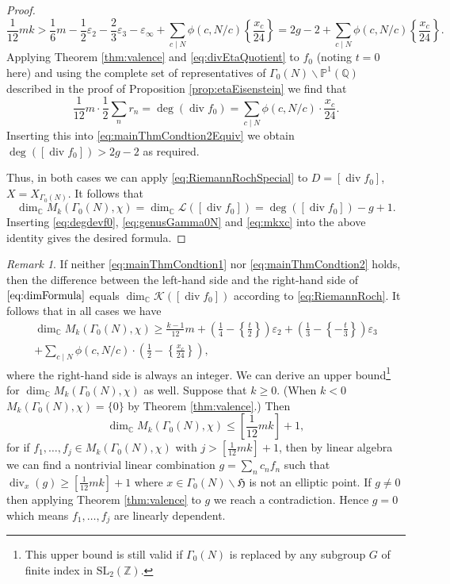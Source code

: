 \documentclass[12pt]{amsart}
\numberwithin{equation}{section}
\theoremstyle{plain}
\theoremstyle{definition}
\theoremstyle{remark}
\newtheorem{rema}[thm]{Remark}
\renewcommand\div{\mathop{\mathrm{div}}}
\newcommand\numC{\mathbb{C}}
\newcommand\projQ{\mathbb{P}^1(\mathbb{Q})}
\newcommand\slZ{\mathrm{SL}_2(\mathbb{Z})}
\newcommand\uhp{\mathfrak{H}}
\begin{document}
\begin{proof}
\begin{equation}
\label{eq:mainThmCondtion2Equiv}
\frac{1}{12}mk>\frac{1}{6}m-\frac{1}{2}\varepsilon_2-\frac{2}{3}\varepsilon_3-\varepsilon_\infty+\sum_{c\mid N}\phi(c,N/c)\left\{\frac{x_c}{24}\right\}=2g-2+\sum_{c\mid N}\phi(c,N/c)\left\{\frac{x_c}{24}\right\}.
\end{equation}
Applying Theorem \ref{thm:valence} and \eqref{eq:divEtaQuotient} to $f_0$ (noting $t=0$ here) and using the complete set of representatives of $\Gamma_0(N)\backslash\projQ$ described in the proof of Proposition \ref{prop:etaEisenstein} we find that
\begin{equation}
\label{eq:mkxc}
\frac{1}{12}m\cdot\frac{1}{2}\sum_nr_n=\deg(\div f_0)=\sum_{c \mid N}\phi(c,N/c)\cdot\frac{x_c}{24}.
\end{equation}
Inserting this into \eqref{eq:mainThmCondtion2Equiv} we obtain $\deg\left([\div f_0]\right)>2g-2$ as required.

Thus, in both cases we can apply \eqref{eq:RiemannRochSpecial} to $D=[\div f_0]$, $X=X_{\Gamma_0(N)}$. It follows that
\begin{equation*}
\dim_\numC M_k(\Gamma_0(N), \chi)=\dim_\numC\mathscr{L}([\div f_0])=\deg([\div f_0])-g+1.
\end{equation*}
Inserting \eqref{eq:degdevf0}, \eqref{eq:genusGamma0N} and \eqref{eq:mkxc} into the above identity gives the desired formula.
\end{proof}
\begin{rema}
\label{rema:uboundlbound}
If neither \eqref{eq:mainThmCondtion1} nor \eqref{eq:mainThmCondtion2} holds, then the difference between the left-hand side and the right-hand side of $\eqref{eq:dimFormula}$ equals $\dim_\numC\mathscr{K}([\div f_0])$ according to \eqref{eq:RiemannRoch}. It follows that in all cases we have
\begin{multline*}
\dim_\numC M_k(\Gamma_0(N), \chi)\geq\frac{k-1}{12}m+\left(\frac{1}{4}-\left\{\frac{t}{2}\right\}\right)\varepsilon_2+\left(\frac{1}{3}-\left\{-\frac{t}{3}\right\}\right)\varepsilon_3\\
+\sum_{c\mid N}\phi(c,N/c)\cdot\left(\frac{1}{2}-\left\{\frac{x_c}{24}\right\}\right),
\end{multline*}
where the right-hand side is always an integer. We can derive an upper bound\footnote{This upper bound is still valid if $\Gamma_0(N)$ is replaced by any subgroup $G$ of finite index in $\slZ$.} for $\dim_\numC M_k(\Gamma_0(N), \chi)$ as well. Suppose that $k\geq 0$. (When $k<0$ $M_k(\Gamma_0(N), \chi)=\{0\}$ by Theorem \ref{thm:valence}.) Then
\begin{equation*}
\dim_\numC M_k(\Gamma_0(N), \chi) \leq \left[\frac{1}{12}mk\right]+1,
\end{equation*}
for if $f_1,\dots,f_j\in M_k(\Gamma_0(N), \chi)$ with $j>\left[\frac{1}{12}mk\right]+1$, then by linear algebra we can find a nontrivial linear combination $g=\sum_n c_nf_n$ such that $\div_x(g)\geq \left[\frac{1}{12}mk\right]+1$ where $x\in \Gamma_0(N)\backslash\uhp$ is not an elliptic point. If $g \neq 0$ then applying Theorem \ref{thm:valence} to $g$ we reach a contradiction. Hence $g=0$ which means $f_1,\dots,f_j$ are linearly dependent.
\end{rema}
\end{document}
